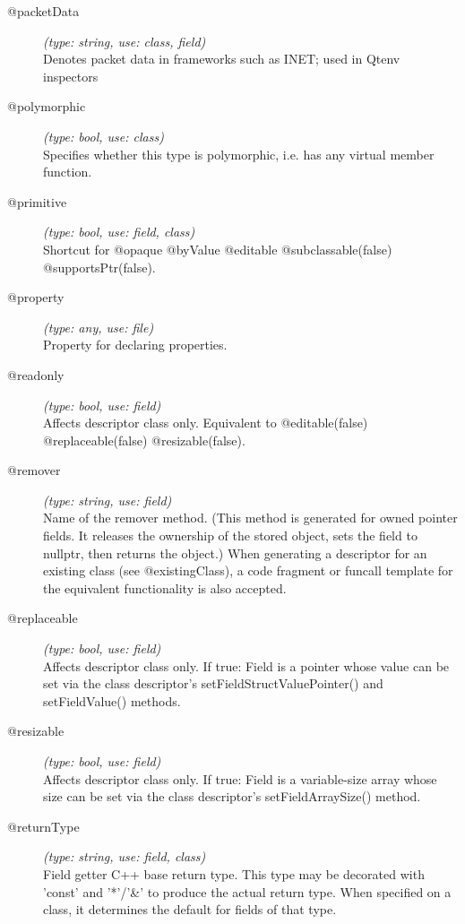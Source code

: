 \begin{description}
\item[@packetData] \textit{(type: string, use: class, field)} \\
  Denotes packet data in frameworks such as INET; used in Qtenv inspectors

\item[@polymorphic] \textit{(type: bool, use: class)} \\
  Specifies whether this type is polymorphic, i.e. has any virtual member
  function.

\item[@primitive] \textit{(type: bool, use: field, class)} \\
  Shortcut for @opaque @byValue @editable @subclassable(false)
  @supportsPtr(false).

\item[@property] \textit{(type: any, use: file)} \\
  Property for declaring properties.

\item[@readonly] \textit{(type: bool, use: field)} \\
  Affects descriptor class only. Equivalent to @editable(false)
  @replaceable(false) @resizable(false).

\item[@remover] \textit{(type: string, use: field)} \\
  Name of the remover method. (This method is generated for owned pointer
  fields. It releases the ownership of the stored object, sets the field to
  nullptr, then returns the object.) When generating a descriptor for an
  existing class (see @existingClass), a code fragment or funcall template for
  the equivalent functionality is also accepted.

\item[@replaceable] \textit{(type: bool, use: field)} \\
  Affects descriptor class only. If true: Field is a pointer whose value can
  be set via the class descriptor's setFieldStructValuePointer() and
  setFieldValue() methods.

\item[@resizable] \textit{(type: bool, use: field)} \\
  Affects descriptor class only. If true: Field is a variable-size array whose
  size can be set via the class descriptor's setFieldArraySize() method.

\item[@returnType] \textit{(type: string, use: field, class)} \\
  Field getter C++ base return type. This type may be decorated with 'const'
  and '*'/'\&' to produce the actual return type. When specified on a class,
  it determines the default for fields of that type.


\end{description}
